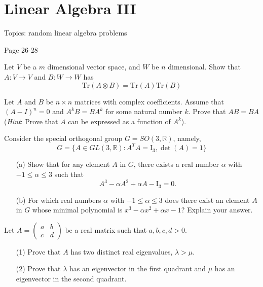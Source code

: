 \chapter{Linear Algebra III}
Topics: random linear algebra problems

Page 26-28

\begin{prop}
    Let $V$ be a $m$ dimensional vector space, and $W$ be $n$ dimensional. Show that $A:V\to V$ and $B: W\to W$ has 
    \begin{equation*}
        \text{Tr}(A\otimes B)=\text{Tr}(A)\text{Tr}(B)
    \end{equation*}
\end{prop}


\begin{prob}[S2013-Q5]
    Let \(A\) and \(B\) be \(n \times n\) matrices with complex coefficients. Assume that \((A - I)^n = 0\) and \(A^k B = BA^k\) for some natural number \(k\). Prove that \(AB = BA\) (\textit{Hint}: Prove that \(A\) can be expressed as a function of \(A^k\)).
\end{prob}

\begin{prob}[F2011-Q2]
    Consider the special orthogonal group \(G=SO(3,\mathbb{R})\), namely,
    \[G=\{A\in GL(3,\mathbb{R}): A^T A=\mathrm{I}_3, \det(A)=1\}\]
    \begin{itemize}
        \item[(a)] Show that for any element \(A\) in \(G\), there exists a real number \(\alpha\) with \(-1\leq\alpha\leq 3\) such that
        \[A^3-\alpha A^2+\alpha A-\mathrm{I}_3=0.\]
        \item[(b)] For which real numbers \(\alpha\) with \(-1\leq\alpha\leq 3\) does there exist an element \(A\) in \(G\) whose minimal polynomial is \(x^3-\alpha x^2+\alpha x-1\)? Explain your answer.
    \end{itemize}
\end{prob}


\begin{prob}[F2007-Q3]
    Let \(A = \begin{pmatrix} a & b \\ c & d \end{pmatrix}\) be a real matrix such that \(a,b,c,d > 0\).
    \begin{itemize}
        \item[(1)] Prove that \(A\) has two distinct real eigenvalues, \(\lambda > \mu\).
        \item[(2)] Prove that \(\lambda\) has an eigenvector in the first quadrant and \(\mu\) has an eigenvector in the second quadrant.
    \end{itemize}
\end{prob}


